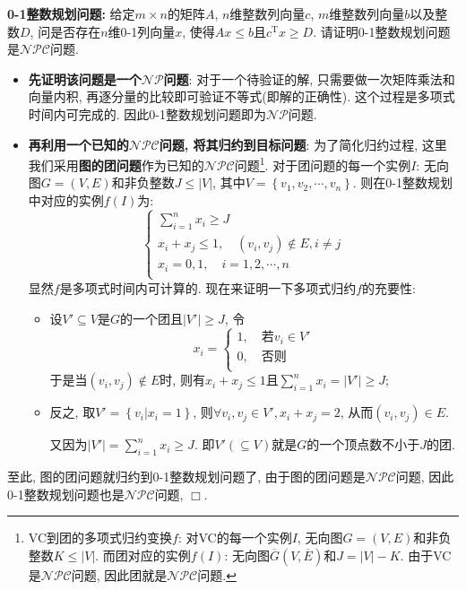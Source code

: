 \documentclass{article}
\begin{document}
\begin{homeworkProblem}
	\textbf{0-1整数规划问题:} 给定$m\times n$的矩阵$A$, $n$维整数列向量$c$, $m$维整数列向量$b$以及整数$D$, 问是否存在$n$维0-1列向量$x$, 使得$Ax\leq b$且$c^{\text{T}}x\geq D$. 请证明0-1整数规划问题是$\mathcal{NPC}$问题.

	\solution 
	\begin{itemize}
		\item \textbf{先证明该问题是一个$\mathcal{NP}$问题}: 对于一个待验证的解, 只需要做一次矩阵乘法和向量内积, 再逐分量的比较即可验证不等式(即解的正确性). 这个过程是多项式时间内可完成的. 因此0-1整数规划问题即为$\mathcal{NP}$问题.
		\item \textbf{再利用一个已知的$\mathcal{NPC}$问题, 将其归约到目标问题}: 为了简化归约过程, 这里我们采用\textbf{图的团问题}作为已知的$\mathcal{NPC}$问题\footnote{VC到团的多项式归约变换$f$: 对VC的每一个实例$I$, 无向图$G=(V,E)$和非负整数$K\leq |V|$. 而团对应的实例$f(I)$: 无向图$\overline{G}\left(V,\overline{E}\right)$和$J=|V|-K$. 由于VC是$\mathcal{NPC}$问题, 因此团就是$\mathcal{NPC}$问题.}. 对于团问题的每一个实例$I$: 无向图$G=(V,E)$和非负整数$J\leq |V|$, 其中$V=\left\{ v_1,v_2,\cdots ,v_n \right\}$. 则在0-1整数规划中对应的实例$f(I)$为: 
		$$
		\begin{cases}
			\displaystyle \sum_{i=1}^n{x_i}\ge J\\
			x_i+x_j\le 1,\quad \left( v_i,v_j \right) \notin E,i\ne j\\
			x_i=0,1,\quad i=1,2,\cdots ,n\\
		\end{cases}
		$$
		显然$f$是多项式时间内可计算的. 现在来证明一下多项式归约$f$的充要性:
		\begin{itemize}
			\item 设$V'\subseteq V$是$G$的一个团且$\left|V'\right|\geq J$, 令$$x_i=\begin{cases}
				1,\quad \text{若}v_i\in V'\\
				0,\quad \text{否则}\\
			\end{cases}$$
			于是当$(v_i,v_j)\notin E$时, 则有$x_i+x_j\leq 1$且$\displaystyle \sum_{i=1}^n{x_i}=\left| V' \right|\ge J	$;
			\item 反之, 取$V'=\left\{ v_i|x_i=1 \right\}$, 则$\forall v_i,v_j\in V',x_i+x_j=2$, 从而$(v_i,v_j)\in E$. 
			
			又因为$\displaystyle \left| V' \right|=\sum_{i=1}^n{x_i}\ge J$. 即$V'(\subseteq V)$就是$G$的一个顶点数不小于$J$的团.
		\end{itemize}
	\end{itemize}
	至此, 图的团问题就归约到0-1整数规划问题了, 由于图的团问题是$\mathcal{NPC}$问题, 因此0-1整数规划问题也是$\mathcal{NPC}$问题, $\Box$.
\end{homeworkProblem}
\end{document}
